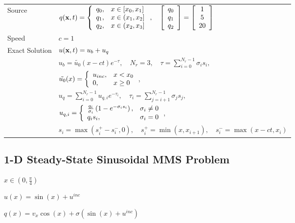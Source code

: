 \begin{table}[h]
\begin{tabular}{l l}
Source & $q(\mathbf{x},t)=\left\{\begin{array}{c l}
   q_0, & x\in[x_0,x_1]\\
   q_1, & x\in(x_1,x_2]\\
   q_2, & x\in(x_2,x_3]
   \end{array}\right.,\quad
   \left[\begin{array}{c}q_0\\q_1\\q_2\end{array}\right] =
      \left[\begin{array}{c}1\\5\\20\end{array}\right]$\\
Speed & $c=1$\\
Exact Solution & $u(\mathbf{x},t) = u_b + u_q$\\
   & $u_b=\tilde{u_0}(x-ct)e^{-\tau},
        \quad N_r=3,\quad
        \tau = \sum\limits_{i=0}^{N_r-1} \sigma_i s_i,$\\
   & $\tilde{u_0}(x) = \left\{\begin{array}{l l}
        u_{inc}, & x<x_0\\
        0,       & x\geq 0
     \end{array}\right.$,\\
   & $u_q=\sum\limits_{i=0}^{N_r-1}u_{q,i}e^{-\tau_i},\quad
        \tau_i = \sum\limits_{j=i+1}^{N_r-1} \sigma_j s_j,$\\
   & $u_{q,i} = \left\{\begin{array}{l l}
        \frac{q_i}{\sigma_i}\left(1-e^{-\sigma_i s_i}\right), & \sigma_i\neq 0\\
        q_i s_i, & \sigma_i = 0
        \end{array}\right.$,\\
   & $s_i = \max(s^+_i-s^-_i,0),\quad
     s^+_i = \min(x,x_{i+1}),\quad
     s^-_i = \max(x-ct,x_i)$ \\
\bottomrule\end{tabular}
\end{table}
\subsection{1-D Steady-State Sinusoidal MMS Problem}\label{sec:mms_sin_ss}
$x\in(0,\frac{\pi}{4})$

$u(x) = \sin(x) + u^{inc}$

$q(x) = v_x\cos(x) + \sigma(\sin(x) + u^{inc})$

